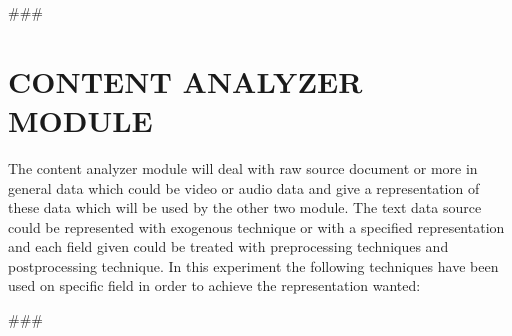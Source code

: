 
\usepackage{comment}


###

\section{CONTENT ANALYZER MODULE}\label{sec:ca}
The content analyzer module will deal with raw source document or more in general data which could be
video or audio data and give a representation of these data which will be used by the other two module.
The text data source could be represented with exogenous technique or with a specified representation
and each field given could be treated with preprocessing techniques and postprocessing technique.
In this experiment the following techniques have been used on specific field in order to achieve the
representation wanted:
\hfill\break
\hfill\break

###


\begin{comment}
Author = DIEGO MICCOLI
Alias = Kozen88
Organization = SWAP Research Group UniBa
Date = 27-12-2023

This mini template is not working by itself because there are latex command missing needed
to compile the file and give as output a pdf file, in addition it has been added jinja
statement in order to control the rendering of the latex file with the jinja library, for these
reasons it needs to be used with the other mini chunks in conjunction.
\end{comment}